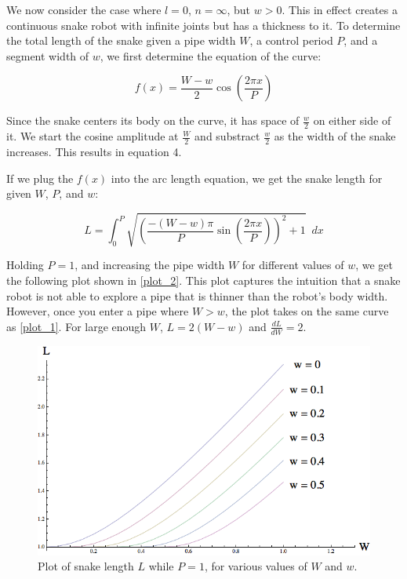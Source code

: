 We now consider the case where $l = 0$, $n = \infty$, but $w > 0$. This in effect creates a continuous snake robot with infinite joints but has a thickness to it. To determine the total length of the snake given a pipe width $W$, a control period $P$, and a segment width of $w$, we first determine the equation of the curve:


\begin{equation}
f(x) =  \frac{W-w}{2} \cos \left( \frac{2 \pi x}{P} \right) 
\end{equation}


Since the snake centers its body on the curve, it has space of $\frac{w}{2}$ on either side of it. We start the cosine amplitude at $\frac{W}{2}$ and substract $\frac{w}{2}$ as the width of the snake increases. This results in equation 4.

If we plug the $f(x)$ into the arc length equation, we get the snake length for given $W$, $P$, and $w$:


\begin{equation}
L = \int_{0}^{P} \sqrt{\left( \frac{-(W-w) \pi}{P} \sin \left( \frac{2 \pi x}{P} \right)  \right)^2 + 1} \,\,\, dx
\end{equation}


Holding $P = 1$, and increasing the pipe width $W$ for different values of $w$, we get the following plot shown in \autoref{plot_2}. This plot captures the intuition that a snake robot is not able to explore a pipe that is thinner than the robot's body width. However, once you enter a pipe where $W > w$, the plot takes on the same curve as \autoref{plot_1}. For large enough $W$, $L = 2(W-w)$ and $\frac{dL}{dW} = 2$.

\begin{figure}[htbp]
\centering
\includegraphics[keepaspectratio,width=400pt,height=0.75\textheight]{2011_01_24_Plot_WidthAnchor.png}
\caption{Plot of snake length $L$ while $P=1$, for various values of $W$ and $w$.}
\label{plot_2}
\end{figure}



